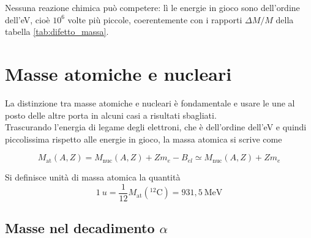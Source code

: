 Nessuna reazione chimica può competere: lì le energie in gioco sono dell'ordine dell'eV, cioè $10^{6}$ volte più piccole, coerentemente con i rapporti $\Delta M/M$ della tabella \ref{tab:difetto_massa}.

\section{Masse atomiche e nucleari}

La distinzione tra masse atomiche e nucleari è fondamentale e usare le une al posto delle altre porta in alcuni casi a risultati sbagliati.\\

Trascurando l'energia di legame degli elettroni, che è dell'ordine dell'eV e quindi piccolissima rispetto alle energie in gioco, la massa atomica si scrive come
%
\begin{tcolorbox}[colback=black!5!white, colframe=black!45!white, boxrule=0.8pt]
\begin{equation}
    M_{\text{at}}(A,Z) = M_{\text{nuc}}(A,Z) + Z m_e - B_{el} \simeq M_{\text{nuc}}(A,Z) + Z m_e
    \label{eq:massa_atomica}
\end{equation}
\end{tcolorbox}

Si definisce unità di massa atomica la quantità
%
\begin{equation}
    1 \ u = \frac{1}{12} M_{\text{at}}({}^{12}\mathrm{C}) = 931,5 \ \mathrm{MeV}
\end{equation}

\subsection{Masse nel decadimento \texorpdfstring{$\alpha$}{alfa}}

